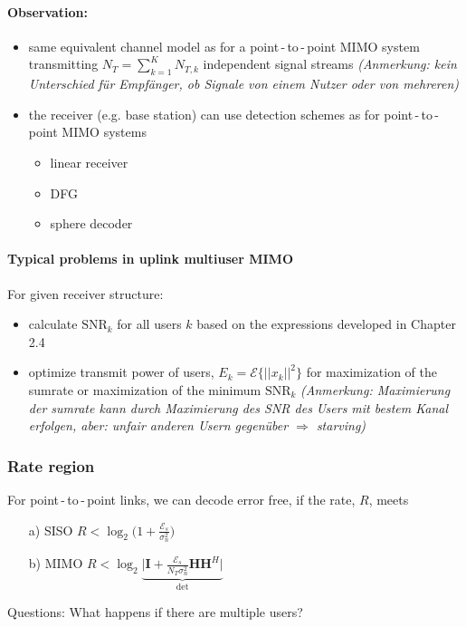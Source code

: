 \documentclass[a4paper, 10pt]{article}
\begin{document}
\paragraph*{Observation:}
\begin{itemize}
	\item same equivalent channel model as for a point\,-\,to\,-\,point MIMO system transmitting $N_T = \sum_{k = 1}^{K} N_{T,k} $ independent signal streams \quad \textit{(Anmerkung: kein Unterschied f\"ur Empf\"anger, ob Signale von einem Nutzer oder von mehreren)}
	\item the receiver (e.g. base station) can use detection schemes as for point\,-\,to\,-\,point MIMO systems
	\begin{itemize}
		\item linear receiver
		\item DFG
		\item sphere decoder
	\end{itemize}
\end{itemize}
\paragraph*{Typical problems in uplink multiuser MIMO}
For given receiver structure:
\begin{itemize}
	\item calculate $\text{SNR}_k $ for all users $k $ based on the expressions developed in Chapter 2.4
	\item optimize transmit power of users, $E_k = \mathcal{E}\bigl\{||x_k||^2\bigr\} $ for maximization of the sumrate or maximization of the minimum $\text{SNR}_k $ \quad \textit{(Anmerkung: Maximierung der \textit{sumrate} kann durch Maximierung des SNR des Users mit bestem Kanal erfolgen, aber: unfair anderen Usern gegen\"uber $\Rightarrow $ \textit{starving})}
\end{itemize}
\subsubsection{Rate region}
For point\,-\,to\,-\,point links, we can decode error free, if the rate, $R$, meets
  \begin{itemize}
     \item[a)] SISO	$R < \log_2\bigl(1+\frac{\mathcal{E}_s}{\sigma_n^2}	\bigr) $
     \item[b)] MIMO $R < \log_2\underbrace{\bigl|\mathbf{I} + \frac{\mathcal{E}_s}{N_T\sigma_n^2} \mathbf{HH}^H\bigr|}_{\text{det}} $
	\end{itemize} 
Questions: What happens if there are multiple users?
\end{document}
